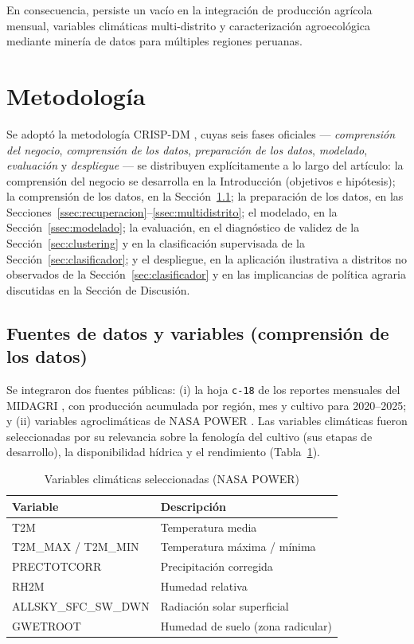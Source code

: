 \documentclass[conference]{IEEEtran}
\begin{document}
En consecuencia, persiste un vacío en la integración de producción agrícola mensual, variables climáticas multi-distrito y caracterización agroecológica mediante minería de datos para múltiples regiones peruanas.

\section{Metodología}

Se adoptó la metodología CRISP-DM \cite{chapman2000}, cuyas seis fases oficiales --- \emph{comprensión del negocio}, \emph{comprensión de los datos}, \emph{preparación de los datos}, \emph{modelado}, \emph{evaluación} y \emph{despliegue} --- se distribuyen explícitamente a lo largo del artículo: la comprensión del negocio se desarrolla en la Introducción (objetivos e hipótesis); la comprensión de los datos, en la Sección~\ref{ssec:fuentes}; la preparación de los datos, en las Secciones~\ref{ssec:recuperacion}--\ref{ssec:multidistrito}; el modelado, en la Sección~\ref{ssec:modelado}; la evaluación, en el diagnóstico de validez de la Sección~\ref{sec:clustering} y en la clasificación supervisada de la Sección~\ref{sec:clasificador}; y el despliegue, en la aplicación ilustrativa a distritos no observados de la Sección~\ref{sec:clasificador} y en las implicancias de política agraria discutidas en la Sección de Discusión.

\subsection{Fuentes de datos y variables (comprensión de los datos)}
\label{ssec:fuentes}
Se integraron dos fuentes públicas: (i) la hoja \texttt{c-18} de los reportes mensuales del MIDAGRI \cite{midagrihist}, con producción acumulada por región, mes y cultivo para 2020--2025; y (ii) variables agroclimáticas de NASA POWER \cite{nasa2025}. Las variables climáticas fueron seleccionadas por su relevancia sobre la fenología del cultivo (sus etapas de desarrollo), la disponibilidad hídrica y el rendimiento \cite{viladrich} (Tabla~\ref{tab:variables}).

\begin{table}[h]
\centering
\caption{Variables climáticas seleccionadas (NASA POWER)}
\label{tab:variables}
\small
\begin{tabular}{l l}
\toprule
\textbf{Variable} & \textbf{Descripción} \\
\midrule
T2M & Temperatura media \\
T2M\_MAX / T2M\_MIN & Temperatura máxima / mínima \\
PRECTOTCORR & Precipitación corregida \\
RH2M & Humedad relativa \\
ALLSKY\_SFC\_SW\_DWN & Radiación solar superficial \\
GWETROOT & Humedad de suelo (zona radicular) \\
\bottomrule
\end{tabular}
\end{table}
\end{document}
